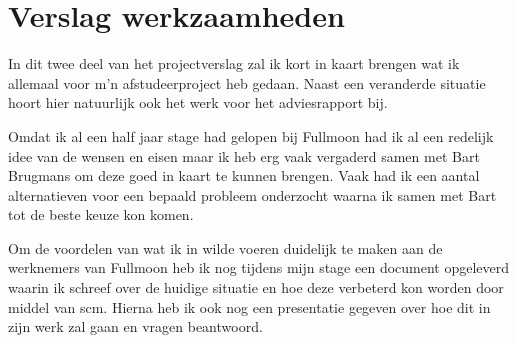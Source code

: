\chapter{Verslag werkzaamheden}

In dit twee deel van het projectverslag zal ik kort in kaart brengen wat ik allemaal voor m'n afstudeerproject heb gedaan. Naast een veranderde situatie hoort hier natuurlijk ook het werk voor het adviesrapport bij. 

Omdat ik al een half jaar stage had gelopen bij Fullmoon had ik al een redelijk idee van de wensen en eisen maar ik heb erg vaak vergaderd samen met Bart Brugmans om deze goed in kaart te kunnen brengen. Vaak had ik een aantal alternatieven voor een bepaald probleem onderzocht waarna ik samen met Bart tot de beste keuze kon komen.

Om de voordelen van wat ik in wilde voeren duidelijk te maken aan de werknemers van Fullmoon heb ik nog tijdens mijn stage een document opgeleverd waarin ik schreef over de huidige situatie en hoe deze verbeterd kon worden door middel van {\sc scm}. Hierna heb ik ook nog een presentatie gegeven over hoe dit in zijn werk zal gaan en vragen beantwoord.